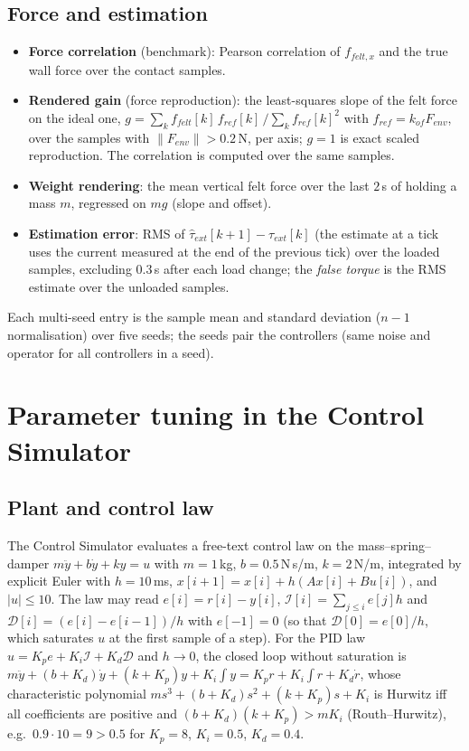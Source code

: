 \documentclass[11pt,a4paper]{article}
\theoremstyle{remark}
\theoremstyle{definition}
\begin{document}
\subsection{Force and estimation}
\begin{itemize}[leftmargin=*,itemsep=2pt]
\item \textbf{Force correlation} (benchmark): Pearson correlation of $f_{felt,x}$ and the true wall force over the contact samples.
\item \textbf{Rendered gain} (force reproduction): the least-squares slope of the felt force on the ideal one, $g=\sum_kf_{felt}[k]\,f_{ref}[k]\,/\sum_kf_{ref}[k]^2$ with $f_{ref}=k_{of}F_{env}$, over the samples with
$\|F_{env}\|>0.2$\,N, per axis; $g=1$ is exact scaled reproduction. The correlation is computed over the same samples.
\item \textbf{Weight rendering}: the mean vertical felt force over the last $2$\,s of holding a mass $m$, regressed on $mg$ (slope and offset).
\item \textbf{Estimation error}: RMS of $\hat\tau_{ext}[k+1]-\tau_{ext}[k]$ (the estimate at a tick uses the current measured at the end of the previous tick) over the loaded samples, excluding $0.3$\,s after
each load change; the \emph{false torque} is the RMS estimate over the unloaded samples.
\end{itemize}
Each multi-seed entry is the sample mean and standard deviation ($n-1$ normalisation) over five seeds; the seeds pair the controllers (same noise and operator for all controllers in a seed).

\section{Parameter tuning in the Control Simulator}\label{sec:tuning}
\subsection{Plant and control law}
The Control Simulator evaluates a free-text control law on the mass--spring--damper $m\ddot y+b\dot y+ky=u$ with $m=1$\,kg, $b=0.5$\,N\,s/m, $k=2$\,N/m, integrated by explicit Euler with $h=10$\,ms,
$x[i+1]=x[i]+h(Ax[i]+Bu[i])$, and $|u|\le10$. The law may read $e[i]=r[i]-y[i]$, $\mathcal I[i]=\sum_{j\le i}e[j]h$ and $\mathcal D[i]=(e[i]-e[i-1])/h$ with $e[-1]=0$ (so that
$\mathcal D[0]=e[0]/h$, which saturates $u$ at the first sample of a step). For the PID law $u=K_pe+K_i\mathcal I+K_d\mathcal D$ and $h\to0$, the closed loop without saturation is
$m\ddot y+(b+K_d)\dot y+(k+K_p)y+K_i\!\int\! y=K_pr+K_i\!\int\! r+K_d\dot r$, whose characteristic polynomial $ms^3+(b+K_d)s^2+(k+K_p)s+K_i$ is Hurwitz iff all coefficients are positive and
$(b+K_d)(k+K_p)>mK_i$ (Routh--Hurwitz), e.g.\ $0.9\cdot10=9>0.5$ for $K_p=8$, $K_i=0.5$, $K_d=0.4$.
\end{document}
